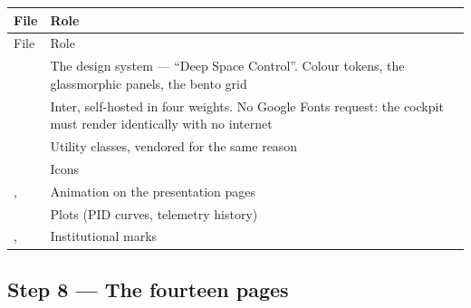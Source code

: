 \begin{longtable}{@{}L{5.3cm}L{8.3cm}@{}}
\toprule
File & Role \\
\midrule
\endfirsthead
\toprule
File & Role \\
\midrule
\endhead
{} &
  The design system --- ``Deep Space Control''. Colour tokens, the
  glassmorphic panels, the bento grid \\
\addlinespace
{} \newline {} &
  Inter, self-hosted in four weights. No Google Fonts request: the cockpit
  must render identically with no internet \\
\addlinespace
{} \newline {} &
  Utility classes, vendored for the same reason \\
\addlinespace
{} \newline {} &
  Icons \\
\addlinespace
{} \newline {}, \newline {} &
  Animation on the presentation pages \\
\addlinespace
{} \newline {} &
  Plots (PID curves, telemetry history) \\
\addlinespace
{}, \newline {} &
  Institutional marks \\
\bottomrule
\end{longtable}

\subsection{Step 8 --- The fourteen pages}
\label{ap:repro-web-pages}

